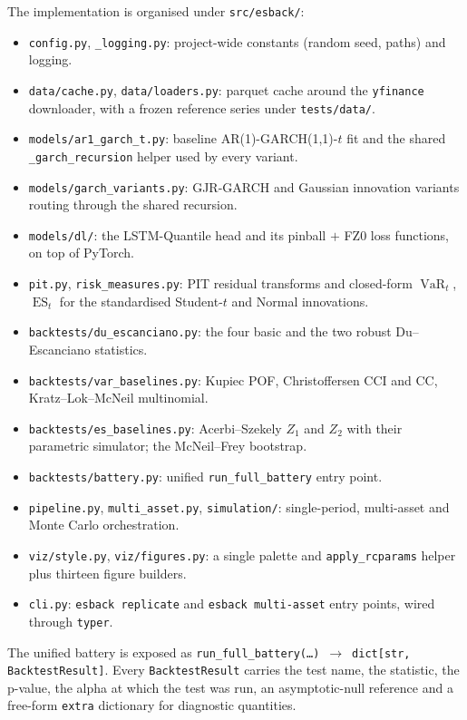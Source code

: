 \documentclass[11pt,a4paper]{article}
\newcommand{\VaR}{\operatorname{VaR}}
\newcommand{\ES}{\operatorname{ES}}
\newcommand{\code}[1]{\texttt{\small #1}}
\newcommand{\package}[1]{\texttt{#1}}
\theoremstyle{plain}
\begin{document}
The implementation is organised under \code{src/esback/}:
\begin{itemize}
  \item \code{config.py}, \code{\_logging.py}: project-wide constants
    (random seed, paths) and logging.
  \item \code{data/cache.py}, \code{data/loaders.py}: parquet cache
    around the \package{yfinance} downloader, with a frozen reference
    series under \code{tests/data/}.
  \item \code{models/ar1\_garch\_t.py}: baseline
    AR(1)-GARCH(1,1)-$t$ fit and the shared
    \code{\_garch\_recursion} helper used by every variant.
  \item \code{models/garch\_variants.py}: GJR-GARCH and Gaussian
    innovation variants routing through the shared recursion.
  \item \code{models/dl/}: the LSTM-Quantile head and its pinball $+$
    FZ0 loss functions, on top of PyTorch.
  \item \code{pit.py}, \code{risk\_measures.py}: PIT residual
    transforms and closed-form $\VaR_t$, $\ES_t$ for the standardised
    Student-$t$ and Normal innovations.
  \item \code{backtests/du\_escanciano.py}: the four basic and the
    two robust Du--Escanciano statistics.
  \item \code{backtests/var\_baselines.py}: Kupiec POF,
    Christoffersen CCI and CC, Kratz--Lok--McNeil multinomial.
  \item \code{backtests/es\_baselines.py}: Acerbi--Szekely $Z_1$
    and $Z_2$ with their parametric simulator; the McNeil--Frey
    bootstrap.
  \item \code{backtests/battery.py}: unified
    \code{run\_full\_battery} entry point.
  \item \code{pipeline.py}, \code{multi\_asset.py},
    \code{simulation/}: single-period, multi-asset and Monte Carlo
    orchestration.
  \item \code{viz/style.py}, \code{viz/figures.py}: a single palette
    and \code{apply\_rcparams} helper plus thirteen figure builders.
  \item \code{cli.py}: \code{esback replicate} and
    \code{esback multi-asset} entry points, wired through
    \package{typer}.
\end{itemize}
The unified battery is exposed as
\code{run\_full\_battery(\dots)}~$\to$~\code{dict[str, BacktestResult]}.
Every \code{BacktestResult} carries the test name, the statistic,
the p-value, the alpha at which the test was run, an asymptotic-null
reference and a free-form \code{extra} dictionary for diagnostic
quantities.
\end{document}
